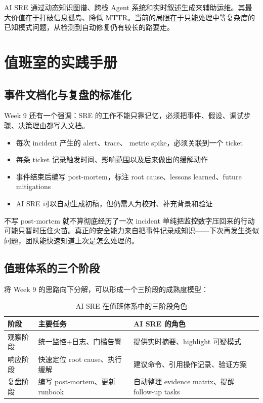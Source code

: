 \documentclass[a4paper]{article}
\begin{document}
AI SRE 通过动态知识图谱、跨栈 Agent 系统和实时叙述生成来辅助运维。其最大价值在于打破信息孤岛、降低 MTTR。当前的局限在于只能处理中等复杂度的已知模式问题，从检测到自动修复仍有较长的路要走。

\section{值班室的实践手册}

\subsection{事件文档化与复盘的标准化}

Week 9 还有一个强调：SRE 的工作不能只靠记忆，必须把事件、假设、调试步骤、决策理由都写入文档。

\begin{itemize}
    \item 每次 incident 产生的 alert、trace、 metric spike，必须关联到一个 ticket
    \item 每条 ticket 记录触发时间、影响范围以及后来做出的缓解动作
    \item 事件结束后编写 post-mortem，标注 root cause、lessons learned、future mitigations
    \item AI SRE 可以自动生成初稿，但仍需人为校对、补充背景和验证
\end{itemize}

\begin{warningbox}{不写 post-mortem 就不算彻底经历了一次 incident}
单纯把监控数字压回来的行动可能只暂时压住火苗。真正的安全能力来自把事件记录成知识——下次再发生类似问题，团队能快速知道上次是怎么处理的。
\end{warningbox}

\subsection{值班体系的三个阶段}

将 Week 9 的思路向下分解，可以形成一个三阶段的成熟度模型：

\begin{table}[H]
\centering
\begin{tabular}{p{} p{} p{}}
\toprule
阶段 & 主要任务 & AI SRE 的角色 \\
\midrule
观察阶段 & 统一监控+日志、门槛告警 & 提供实时摘要、highlight 可疑模式 \\
响应阶段 & 快速定位 root cause、执行缓解 & 建议命令、引用操作记录、验证方案 \\
复盘阶段 & 编写 post-mortem、更新 runbook & 自动整理 evidence matrix、提醒 follow-up tasks \\
\bottomrule
\end{tabular}
\caption{AI SRE 在值班体系中的三阶段角色}
\end{table}
\end{document}
